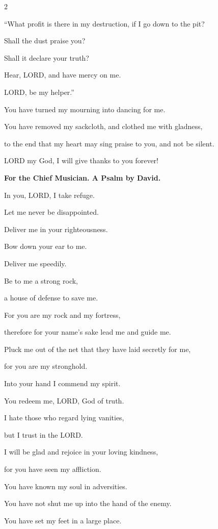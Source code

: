 \begin{multicols}{2}
	
	\myverse{}“What profit is there in my destruction, if I go down to the
	pit?
	
	Shall the dust praise you?
	
	Shall it declare your truth?
	
	
	\myverse{}Hear, LORD, and have mercy on me.
	
	LORD, be my helper.”
	
	
	\myverse{}You have turned my mourning into dancing for me.
	
	You have removed my sackcloth, and clothed me with gladness,
	
	
	\myverse{}to the end that my heart may sing praise to you,
	and not be silent.
	
	LORD my God, I will give thanks to you forever!
	
	
	\mychapter{}\textbf{For the Chief Musician. A Psalm by David.}
	
	\quad \myverse*{}In you, LORD, I take refuge.
	
	Let me never be disappointed.
	
	Deliver me in your righteousness.
	
	
	\myverse{}Bow down your ear to me.
	
	Deliver me speedily.
	
	Be to me a strong rock,
	
	a house of defense to save me.
	
	
	\myverse{}For you are my rock and my fortress,
	
	therefore for your name’s sake lead me and guide me.
	
	
	\myverse{}Pluck me out of the net that they have laid secretly for me,
	
	for you are my stronghold.
	
	
	\myverse{}Into your hand I commend my spirit.
	
	You redeem me, LORD, God of truth.
	
	
	\myverse{}I hate those who regard lying vanities,
	
	but I trust in the LORD.
	
	
	\myverse{}I will be glad and rejoice in your loving kindness,
	
	for you have seen my affliction.
	
	You have known my soul in adversities.
	
	
	\myverse{}You have not shut me up into the hand of the enemy.
	
	You have set my feet in a large place.
	

\end{multicols}
